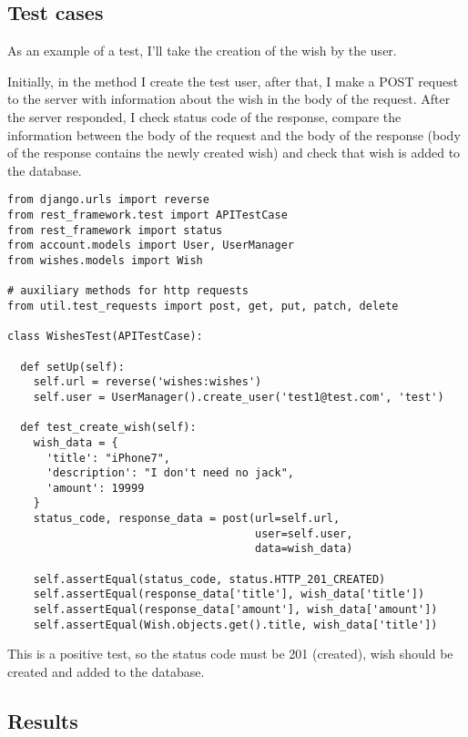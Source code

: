 \subsection{Test cases}
As an example of a test, I'll take the creation of the wish by the user.

Initially, in the method  I create the test user, after that, I make a POST request to the server with information about the wish in the body of the request. After the server responded, I check status code of the response, compare the information between the body of the request and the body of the response (body of the response contains the newly created wish) and check that wish is added to the database.

\begin{lstlisting}
from django.urls import reverse
from rest_framework.test import APITestCase
from rest_framework import status
from account.models import User, UserManager
from wishes.models import Wish

# auxiliary methods for http requests
from util.test_requests import post, get, put, patch, delete

class WishesTest(APITestCase):

  def setUp(self):
    self.url = reverse('wishes:wishes')
    self.user = UserManager().create_user('test1@test.com', 'test')

  def test_create_wish(self):
    wish_data = {
      'title': "iPhone7",
      'description': "I don't need no jack",
      'amount': 19999
    }
    status_code, response_data = post(url=self.url,
                                      user=self.user,
                                      data=wish_data)

    self.assertEqual(status_code, status.HTTP_201_CREATED)
    self.assertEqual(response_data['title'], wish_data['title'])
    self.assertEqual(response_data['amount'], wish_data['amount'])
    self.assertEqual(Wish.objects.get().title, wish_data['title'])

\end{lstlisting}

This is a positive test, so the status code must be 201 (created), wish should be created and added to the database.

\subsection{Results}



\newcommand{\flag}[1]{
\item[]-\textbf{#1}
}

